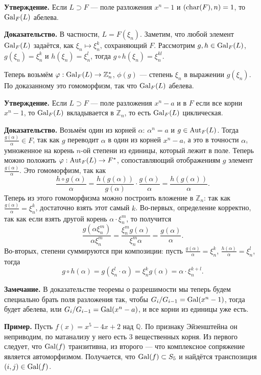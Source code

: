 \textbf{Утверждение.} Если $L \supset F$ --- поле разложения $x^n - 1$ и $(\operatorname{char}(F), n) = 1$, то $\operatorname{Gal}_F(L)$ абелева.

\textbf{Доказательство.} В частности, $L = F(\xi_n)$.
Заметим, что любой элемент $\operatorname{Gal}_F(L)$ задаётся, как $\xi_n \mapsto \xi_n^k$, сохраняющий $F$.
Рассмотрим $g, h \in \operatorname{Gal}_F(L)$, $g(\xi_n) = \xi_n^k$ и $h(\xi_n) = \xi_n^l$, тогда $g \circ h(\xi_n) = \xi_n^{kl}$.

Теперь возьмём $\varphi: \operatorname{Gal}_F(L) \to \mathbb Z_n^*$, $\phi(g)$ --- степень $\xi_n$ в выражении $g(\xi_n)$.
По доказанному это гомоморфизм, так что $\operatorname{Gal}_F(L)$ абелева.

\QED

\textbf{Утверждение.} Если $L \supset F$ --- поле разложения $x^n - a$ и в $F$ если все корни $x^n - 1$, то $\operatorname{Gal}_F(L)$ вкладывается в $\mathbb Z_n$, то есть $\operatorname{Gal}_F(L)$ циклическая.

\textbf{Доказательство.} Возьмём один из корней $\alpha$: $\alpha^n = a$ и $g \in \operatorname{Aut}_F(L)$.
Тогда $\frac{g(\alpha)}{\alpha} \in F$, так как $g$ переводит $\alpha$ в один из корней $x^n - a$, а это в точности $\alpha$, умноженное на корень $n$-ой степени из единицы, который лежит в поле.
Теперь можно положить $\varphi: \operatorname{Aut}_F(L) \to F^*$, сопоставляющий отображениям $g$ элемент $\frac{g(\alpha)}{\alpha}$.
Это гомоморфизм, так как
\[
    \frac{h \circ g(\alpha)}{\alpha} = \frac{h(g(\alpha))}{g(\alpha)} \cdot \frac{g(\alpha)}{\alpha} = \frac{h(g(\alpha))}{\alpha}.
\]
Теперь из этого гомоморфизма можно построить вложение в $\mathbb Z_n$: так как $\frac{g(\alpha)}{\alpha} = \xi_n^k$, достаточно взять этот самый $k$.
Во-первых, определение корректно, так как если взять другой корень $\alpha \cdot \xi_n^m$, то получится 
\[
    \frac{g(\alpha \xi_n^m)}{\alpha \xi_n^m} = \frac{\xi_n^m g(\alpha)}{\xi_n^m \alpha} = \frac{g(\alpha)}{\alpha}.
\]
Во-вторых, степени суммируются при композиции: пусть $\frac{g(\alpha)}{\alpha} = \xi_n^k$, $\frac{h(\alpha)}{\alpha} = \xi_n^l$, тогда
\[
    g \circ h(\alpha) = g(\xi_n^l \cdot \alpha) = \xi_n^k g(\alpha) = \alpha \cdot \xi_n^{k+l}.
\]

\QED

\textbf{Замечание.} В доказательстве теоремы о разрешимости мы теперь будем специально брать поля разложения так, чтобы $G_i / G_{i-1} = \operatorname{Gal}(x^n - 1)$, тогда будет абелева, или $G_i / G_{i-1} = \operatorname{Gal}(x^n - a)$, и все корни из единицы уже есть.

\textbf{Пример.} Пусть $f(x) = x^5 - 4x + 2$ над $\mathbb Q$.
По признаку Эйзенштейна он неприводим, по матанализу у него есть 3 вещественных корня.
Из первого следует, что $\operatorname{Gal}(f)$ транзитивна, из второго --- что комплексное сопряжение является автоморфизмом.
Получается, что $\operatorname{Gal}(f) \subset S_5$ и найдётся транспозиция $(i, j) \in \operatorname{Gal}(f)$.

